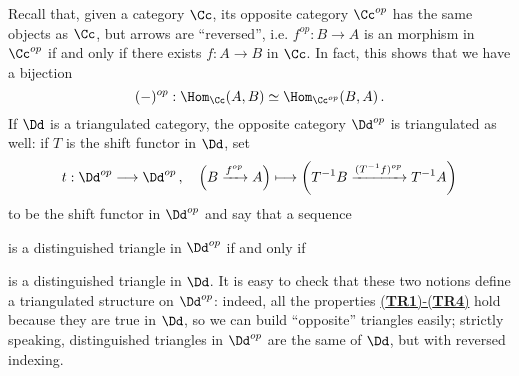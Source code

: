 \begin{ex}
    Recall that, given a category $\Cc$, its opposite category $\Cc^{op}$
    has the same objects as $\Cc$, but arrows are ``reversed'', i.e.
    $f^{op}: B \to A$ is an morphism in $\Cc^{op}$ if and only if
    there exists $f:A \to B$ in $\Cc$. In fact, this shows that
    we have a bijection
    \begin{equation*}
        (-)^{op} : \Hom_{\Cc}(A,B) \simeq \Hom_{\Cc^{op}}(B,A)\,.
    \end{equation*}
    If $\Dd$ is a triangulated category, the opposite category $\Dd^{op}$
    is triangulated as well: if $T$ is the shift functor in $\Dd$,
    set 
    \begin{equation*}
        t : \Dd^{op} \longrightarrow \Dd^{op}\,,
        \quad
        \left( B \xrightarrow[]{f^{op}} A \right)
        \longmapsto
        \left( T^{-1}B \xrightarrow[]{(T^{-1}f)^{op}} T^{-1}A \right)
    \end{equation*}
    to be the shift functor in $\Dd^{op}$ and say that a sequence
    \begin{center}
    \end{center}
    is a distinguished triangle in $\Dd^{op}$
    if and only if 
    \begin{center}
    \end{center}
    is a distinguished triangle in $\Dd$.
    It is easy to check that these two notions define 
    a triangulated structure on $\Dd^{op}$:
    indeed, all the properties \hyperref[TR1]{(\textbf{TR1})-(\textbf{TR4})}
    hold because they are true in $\Dd$, so
    we can build ``opposite'' triangles easily;
    strictly speaking, distinguished triangles
    in $\Dd^{op}$ are the same of $\Dd$,
    but with reversed indexing.
\end{ex}


